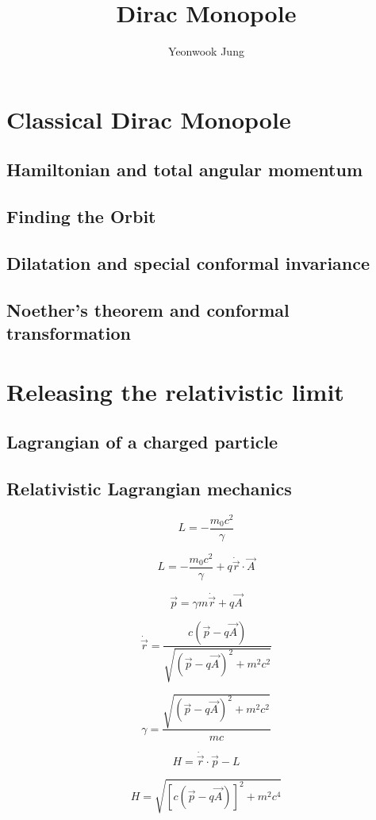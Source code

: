\documentclass[titlepage]{article}
\begin{document}
\title{Dirac Monopole}
\author{Yeonwook Jung}
\date{}
\maketitle
\tableofcontents

\newpage

\section{Classical Dirac Monopole}
\subsection{Hamiltonian and total angular momentum}
\subsection{Finding the Orbit}
\subsection{Dilatation and special conformal invariance}
\subsection{Noether's theorem and conformal transformation}
\section{Releasing the relativistic limit}
\subsection{Lagrangian of a charged particle}
\subsection{Relativistic Lagrangian mechanics}

$$L=-\frac{m_0c^2}{\gamma}$$

$$L=-\frac{m_0c^2}{\gamma}+q\dot{\vec{r}} \cdot \vec{A}$$

$$\vec{p}=\gamma m \dot{\vec{r}}+q\vec{A}$$

$$\dot{\vec{r}}=\frac{c(\vec{p}-q\vec{A})}{\sqrt{(\vec{p}-q\vec{A})^2+m^2c^2}}$$

$$\gamma=\frac{\sqrt{(\vec{p}-q\vec{A})^2+m^2c^2}}{mc}$$

$$H=\dot{\vec{r}} \cdot \vec{p} - L$$

$$H=\sqrt{[c(\vec{p}-q\vec{A})]^2+m^2c^4}$$
\end{document}

